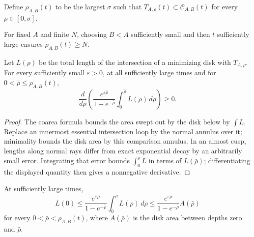 \begin{definition}
\label{def:chow-iv-almost-cusp-depth}
Define \(\rho_{A,B}(t)\) to be the largest \(\sigma\) such that
\(T_{A,\rho}(t)\subset\mathcal C_{A,B}(t)\) for every
\(\rho\in[0,\sigma]\).
\end{definition}

\begin{remark}
\label{rem:chow-iv-almost-cusps-arbitrary-depth}
For fixed \(A\) and finite \(N\), choosing \(B<A\) sufficiently small and then
\(t\) sufficiently large ensures \(\rho_{A,B}(t)\ge N\).
\end{remark}

\begin{lemma}
\label{lem:chow-iv-cusp-length-monotonicity}
Let \(L(\rho)\) be the total length of the intersection of a minimizing disk
with \(T_{A,\rho}\).  For every sufficiently small \(\varepsilon>0\), at all
sufficiently large times and for \(0<\bar\rho\le\rho_{A,B}(t)\),
\[
 \frac d{d\bar\rho}\left(
 \frac{e^{\varepsilon\bar\rho}}{1-e^{-\bar\rho}}
 \int_0^{\bar\rho}L(\rho)\,d\rho\right)\ge0.
\]
\end{lemma}

\begin{proof}
\sketch
The coarea formula bounds the area swept out by the disk below by
\(\int L\).  Replace an innermost essential intersection loop by the normal
annulus over it; minimality bounds the disk area by this comparison annulus.
In an almost cusp, lengths along normal rays differ from exact exponential
decay by an arbitrarily small error.  Integrating that error bounds
\(\int_0^{\bar\rho}L\) in terms of \(L(\bar\rho)\); differentiating the displayed
quantity then gives a nonnegative derivative.
\end{proof}

\begin{corollary}
\label{cor:chow-iv-cusp-length-by-swept-area}
At sufficiently large times,
\[
 L(0)\le
 \frac{e^{\varepsilon\bar\rho}}{1-e^{-\bar\rho}}
 \int_0^{\bar\rho}L(\rho)\,d\rho
 \le\frac{e^{\varepsilon\bar\rho}}{1-e^{-\bar\rho}}A(\bar\rho)
\]
for every \(0<\bar\rho<\rho_{A,B}(t)\), where \(A(\bar\rho)\) is the disk area
between depths zero and \(\bar\rho\).
\end{corollary}


